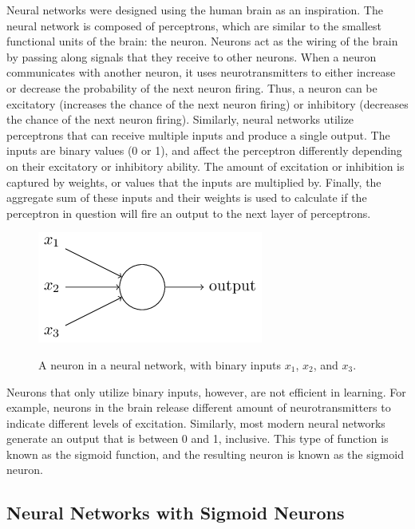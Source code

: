 \documentclass[11pt]{article}
\begin{document}
Neural networks were designed using the human brain as an inspiration. The neural network is composed of perceptrons, which are similar to the smallest functional units of the brain: the neuron. Neurons act as the wiring of the brain by passing along signals that they receive to other neurons. When a neuron communicates with another neuron, it uses neurotransmitters to either increase or decrease the probability of the next neuron firing. Thus, a neuron can be excitatory (increases the chance of the next neuron firing) or inhibitory (decreases the chance of the next neuron firing). Similarly, neural networks utilize perceptrons that can receive multiple inputs and produce a single output. The inputs are binary values (0 or 1), and affect the perceptron differently depending on their excitatory or inhibitory ability. The amount of excitation or inhibition is captured by weights, or values that the inputs are multiplied by. Finally, the aggregate sum of these inputs and their weights is used to calculate if the perceptron in question will fire an output to the next layer of perceptrons. \\

\begin{figure}[H]
    \centering
        \caption{A neuron in a neural network, with binary inputs $x_1$, $x_2$, and $x_3$.}
    \includegraphics[scale=1.0]{sigmoidNeuron.png}
    \label{fig:sigmoidNeuron}
\end{figure}

Neurons that only utilize binary inputs, however, are not efficient in learning. For example, neurons in the brain release different amount of neurotransmitters to indicate different levels of excitation. Similarly, most modern neural networks generate an output that is between 0 and 1, inclusive. This type of function is known as the sigmoid function, and the resulting neuron is known as the sigmoid neuron. 

\subsection{Neural Networks with Sigmoid Neurons}
\end{document}
